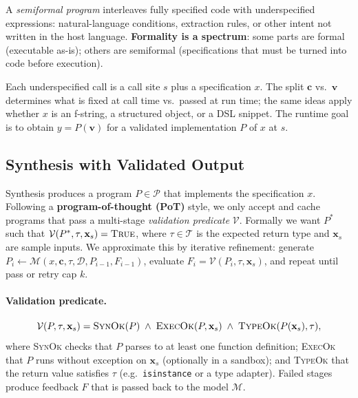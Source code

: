 A \emph{semiformal program} interleaves fully specified code with
underspecified expressions: natural-language conditions, extraction rules, or
other intent not written in the host language.  \textbf{Formality is a
spectrum}: some parts are formal (executable as-is); others are semiformal
(specifications that must be turned into code before execution).

Each underspecified call is a call site $s$ plus a specification $x$.  The
split $\mathbf{c}$ vs.\ $\mathbf{v}$ determines what is fixed at call time
vs.\ passed at run time; the same ideas apply whether $x$ is an f-string, a
structured object, or a DSL snippet.  The runtime goal is to obtain
$y = P(\mathbf{v})$ for a validated implementation $P$ of $x$ at $s$.



\subsection{Synthesis with Validated Output}
\label{sec:abbrev-synthesis}

Synthesis produces a program $P \in \mathcal{P}$ that implements the
specification $x$.  Following a \textbf{program-of-thought (PoT)} style, we
only accept and cache programs that pass a multi-stage \emph{validation
predicate} $\mathcal{V}$.  Formally we want
$P^*$ such that $\mathcal{V}(P^*, \tau, \mathbf{x}_s) = \textsc{True}$, where
$\tau \in \mathcal{T}$ is the expected return type and $\mathbf{x}_s$ are
sample inputs.  We approximate this by iterative refinement: generate
$P_i \gets \mathcal{M}(x, \mathbf{c}, \tau, \mathcal{D}, P_{i-1}, F_{i-1})$,
evaluate $F_i = \mathcal{V}(P_i, \tau, \mathbf{x}_s)$, and repeat until pass or
retry cap $k$.

\paragraph{Validation predicate.}
\begin{equation}
\mathcal{V}(P, \tau, \mathbf{x}_s) =
  \textsc{SynOk}(P) \;\wedge\;
  \textsc{ExecOk}(P, \mathbf{x}_s) \;\wedge\;
  \textsc{TypeOk}(P(\mathbf{x}_s), \tau),
\end{equation}
where \textsc{SynOk} checks that $P$ parses to at least one function
definition; \textsc{ExecOk} that $P$ runs without exception on $\mathbf{x}_s$
(optionally in a sandbox); and \textsc{TypeOk} that the return value
satisfies $\tau$ (e.g.\ \texttt{isinstance} or a type adapter).  Failed
stages produce feedback $F$ that is passed back to the model $\mathcal{M}$.

